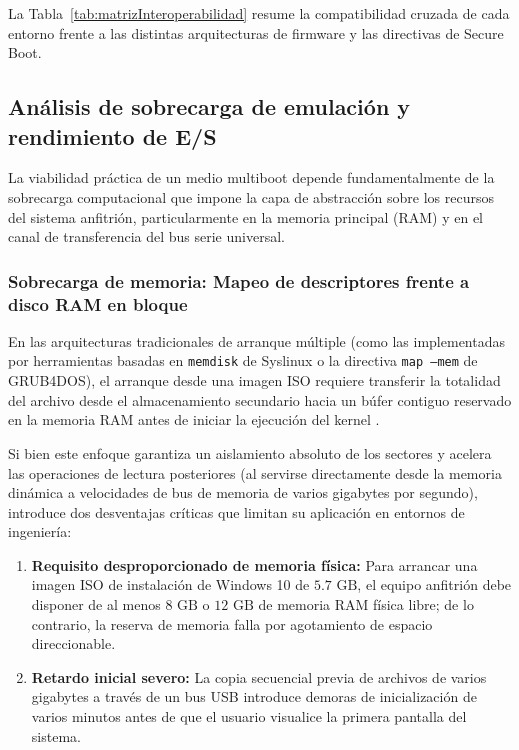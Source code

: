 \documentclass[12pt]{article}
\begin{document}
La Tabla~\ref{tab:matrizInteroperabilidad} resume la compatibilidad cruzada de cada entorno frente a las distintas arquitecturas de firmware y las directivas de Secure Boot.

\subsection{Análisis de sobrecarga de emulación y rendimiento de E/S}
\label{sec:analisisSobrecarga}

La viabilidad práctica de un medio multiboot depende fundamentalmente de la sobrecarga computacional que impone la capa de abstracción sobre los recursos del sistema anfitrión, particularmente en la memoria principal (RAM) y en el canal de transferencia del bus serie universal.

\subsubsection{Sobrecarga de memoria: Mapeo de descriptores frente a disco RAM en bloque}

En las arquitecturas tradicionales de arranque múltiple (como las implementadas por herramientas basadas en \texttt{memdisk} de Syslinux o la directiva \texttt{map --mem} de GRUB4DOS), el arranque desde una imagen ISO requiere transferir la totalidad del archivo desde el almacenamiento secundario hacia un búfer contiguo reservado en la memoria RAM antes de iniciar la ejecución del kernel \parencite{silberschatz2006fundamentos}. 

Si bien este enfoque garantiza un aislamiento absoluto de los sectores y acelera las operaciones de lectura posteriores (al servirse directamente desde la memoria dinámica a velocidades de bus de memoria de varios gigabytes por segundo), introduce dos desventajas críticas que limitan su aplicación en entornos de ingeniería:
\begin{enumerate}[noitemsep, topsep=2pt]
    \item \textbf{Requisito desproporcionado de memoria física:} Para arrancar una imagen ISO de instalación de Windows 10 de $5.7\text{ GB}$, el equipo anfitrión debe disponer de al menos $8\text{ GB}$ o $12\text{ GB}$ de memoria RAM física libre; de lo contrario, la reserva de memoria falla por agotamiento de espacio direccionable.
    \item \textbf{Retardo inicial severo:} La copia secuencial previa de archivos de varios gigabytes a través de un bus USB introduce demoras de inicialización de varios minutos antes de que el usuario visualice la primera pantalla del sistema.
\end{enumerate}
\end{document}
